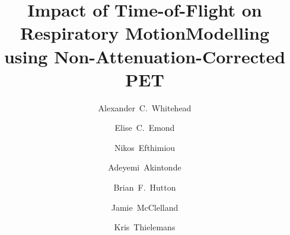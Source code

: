\documentclass[portrait,color=UCLburgundy,margin=2cm]{uclposter}
\begin{document}
\title{Impact of Time-of-Flight on Respiratory Motion\newline Modelling using Non-Attenuation-Corrected PET}

\author[1,2 *]{Alexander~C.~Whitehead}
\author[1]{Elise~C.~Emond}
\author[3]{Nikos~Efthimiou}
\author[1,2]{Adeyemi~Akintonde}
\author[1]{Brian~F.~Hutton}
\author[2]{\newline Jamie~McClelland}
\author[1]{Kris~Thielemans}


\maketitle
\end{document}
